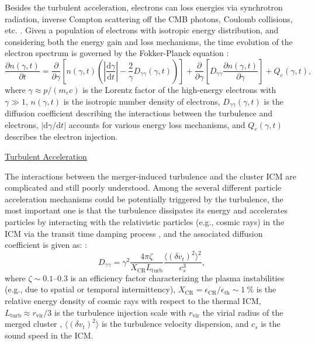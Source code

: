 \documentclass[modern]{aastex61}
\newcommand{\R}[1]{\mathrm{#1}}
\newcommand{\D}[1]{\R{d} #1}
\newcommand{\diff}[2]{\frac{\D{#1}}{\D{#2}}}
\newcommand{\pdiff}[2]{\frac{\partial #1}{\partial #2}}
\begin{document}
Besides the turbulent acceleration, electrons can loss energies via
synchrotron radiation, inverse Compton scattering off the CMB photons,
Coulomb collisions, etc. \citep{sarazin1999}.
Given a population of electrons with isotropic energy distribution, and
considering both the energy gain and loss mechanisms, the time evolution
of the electron spectrum is governed by the Fokker-Planck equation
\citep{eilek1991,schlickeiser2002}:
\begin{equation}
  \label{eq:fokkerplanck}
  \pdiff{n(\gamma,t)}{t} = \pdiff{}{\gamma} \left[ n(\gamma,t) \left(
      \left| \diff{\gamma}{t} \right| -
      \frac{2}{\gamma} D_{\gamma\gamma}(\gamma, t) \right) \right] +
    \pdiff{}{\gamma} \left[ D_{\gamma\gamma} \pdiff{n(\gamma,t)}{\gamma}
    \right] + Q_e(\gamma,t),
\end{equation}
where $\gamma \approx p / (m_e c)$ is the Lorentz factor of the
high-energy electrons with $\gamma \gg 1$,
$n(\gamma, t)$ is the isotropic number density of electrons,
$D_{\gamma\gamma}(\gamma, t)$ is the diffusion coefficient describing
the interactions between the turbulence and electrons,
$|\R{d}\gamma / \R{d}t|$ accounts for various energy loss mechanisms,
and $Q_e(\gamma, t)$ describes the electron injection.

\vspace{1ex}
\noindent\uline{Turbulent Acceleration}

The interactions between the merger-induced turbulence and the cluster
ICM are complicated and still poorly understood.
Among the several different particle acceleration mechanisms could be
potentially triggered by the turbulence, the most important one is that
the turbulence dissipates its energy and accelerates particles by interacting
with the relativistic particles (e.g., cosmic rays) in the ICM via the
transit time damping process
\citep[and references therein]{brunetti2007,brunetti2011},
and the associated diffusion coefficient is given as:
\citep{pinzke2017,miniati2015}:
\begin{equation}
  \label{eq:dpp}
  D_{\gamma\gamma} = \gamma^2 \frac{4\pi \zeta}{X_{\R{CR}} L_{\R{turb}}}
    \frac{\langle (\delta{v_t})^2 \rangle^2}{c_s^3},
\end{equation}
where
$\zeta \sim \numrange{0.1}{0.3}$ is an efficiency factor characterizing
the plasma instabilities (e.g., due to spatial or temporal intermittency),
$X_{\R{CR}} = \epsilon_{\R{CR}} / \epsilon_{\R{th}} \sim \SI{1}{\percent}$
is the relative energy density of cosmic rays with respect to the thermal ICM,
$L_{\R{turb}} \approx r_{\R{vir}}/3$ is the turbulence injection scale with
$r_{\R{vir}}$ the virial radius of the merged cluster \citep{miniati2015},
$\langle (\delta{v_t})^2 \rangle$ is the turbulence velocity dispersion,
and $c_s$ is the sound speed in the ICM.
\end{document}
